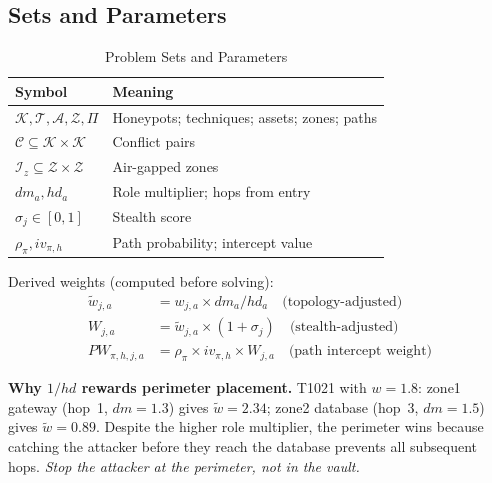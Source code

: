 \documentclass[journal]{IEEEtran}
\newcommand{\tildeW}{\tilde{w}}
\newcommand{\calK}{\mathcal{K}}
\newcommand{\calT}{\mathcal{T}}
\newcommand{\calA}{\mathcal{A}}
\newcommand{\calZ}{\mathcal{Z}}
\newcommand{\calC}{\mathcal{C}}
\newcommand{\calPi}{\mathcal{\Pi}}
\begin{document}
\subsection{Sets and Parameters}

\begin{table}[htbp]
\caption{Problem Sets and Parameters}
\label{tab:sets}
\centering\renewcommand{\arraystretch}{1.2}
\begin{tabular}{@{}ll@{}}
\toprule
\textbf{Symbol}&\textbf{Meaning}\\
\midrule
$\calK,\calT,\calA,\calZ,\calPi$
  & Honeypots; techniques; assets; zones; paths\\
$\calC\subseteq\calK\times\calK$&Conflict pairs\\
$\mathcal{I}_z\subseteq\calZ\times\calZ$&Air-gapped zones\\
$dm_a,hd_a$&Role multiplier; hops from entry\\
$\sigma_j\in[0,1]$&Stealth score\\
$\rho_\pi,iv_{\pi,h}$&Path probability; intercept value\\
\bottomrule
\end{tabular}
\end{table}

Derived weights (computed before solving):
\begin{align}
\tildeW_{j,a}&=w_{j,a}\times dm_a/hd_a
  \quad\text{(topology-adjusted)}\label{eq:tw}\\
W_{j,a}&=\tildeW_{j,a}\times(1+\sigma_j)
  \quad\text{(stealth-adjusted)}\label{eq:w}\\
PW_{\pi,h,j,a}&=\rho_\pi\times iv_{\pi,h}\times W_{j,a}
  \quad\text{(path intercept weight)}\label{eq:pw}
\end{align}

\begin{examplebox}
\textbf{Why $1/hd$ rewards perimeter placement.}
T1021 with $w=1.8$: zone1 gateway (hop~1, $dm=1.3$)
gives $\tildeW=2.34$; zone2 database (hop~3, $dm=1.5$)
gives $\tildeW=0.89$.
Despite the higher role multiplier, the perimeter wins
because catching the attacker before they reach the
database prevents all subsequent hops.
\emph{Stop the attacker at the perimeter, not in the vault.}
\end{examplebox}
\end{document}

